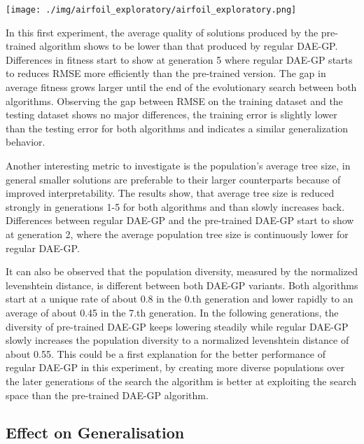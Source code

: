 \documentclass[
  11pt,
]{article}
\let\origfigure\figure
\let\endorigfigure\endfigure
\renewenvironment{figure}[1][2] {
    \expandafter\origfigure\expandafter[H]
} {
    \endorigfigure
}
\begin{document}
\begin{figure}
\centering
\texttt{[image: ./img/airfoil\_exploratory/airfoil\_exploratory.png]}
\caption{Airfoil - First Results}
\end{figure}

In this first experiment, the average quality of solutions produced by the pre-trained algorithm shows to be lower than that produced by regular DAE-GP. Differences in fitness start to show at generation 5 where regular DAE-GP starts to reduces RMSE more efficiently than the pre-trained version. The gap in average fitness grows larger until the end of the evolutionary search between both algorithms. Observing the gap between RMSE on the training dataset and the testing dataset shows no major differences, the training error is slightly lower than the testing error for both algorithms and indicates a similar generalization behavior.

Another interesting metric to investigate is the population's average tree size, in general smaller solutions are preferable to their larger counterparts because of improved interpretability. The results show, that average tree size is reduced strongly in generations 1-5 for both algorithms and than slowly increases back. Differences between regular DAE-GP and the pre-trained DAE-GP start to show at generation 2, where the average population tree size is continuously lower for regular DAE-GP.

It can also be observed that the population diversity, measured by the normalized levenshtein distance, is different between both DAE-GP variants. Both algorithms start at a unique rate of about 0.8 in the 0.th generation and lower rapidly to an average of about 0.45 in the 7.th generation. In the following generations, the diversity of pre-trained DAE-GP keeps lowering steadily while regular DAE-GP slowly increases the population diversity to a normalized levenshtein distance of about 0.55. This could be a first explanation for the better performance of regular DAE-GP in this experiment, by creating more diverse populations over the later generations of the search the algorithm is better at exploiting the search space than the pre-trained DAE-GP algorithm.

\hypertarget{effect-on-generalisation}{%
\subsection{Effect on Generalisation}\label{effect-on-generalisation}}
\end{document}
